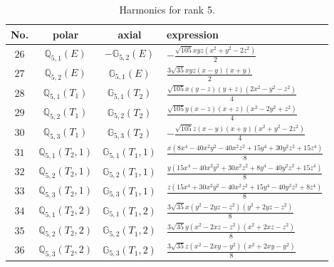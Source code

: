 \documentclass[fleqn,8pt,landscape]{jsarticle}
\begin{document}
\begin{table}[ht!]
\begin{center}
\caption{Harmonics for rank 5.}
\renewcommand{\arraystretch}{1.3}
\begin{tabular}{cccl} \hline \hline
No. & polar & axial & expression \\ \hline
$ 26 $ & $ \mathbb{Q}_{5,1}(E) $ & $ -\mathbb{G}_{5,2}(E) $ & $ - \frac{\sqrt{105} x y z \left(x^{2} + y^{2} - 2 z^{2}\right)}{2} $ \\
$ 27 $ & $ \mathbb{Q}_{5,2}(E) $ & $ \mathbb{G}_{5,1}(E) $ & $ \frac{3 \sqrt{35} x y z \left(x - y\right) \left(x + y\right)}{2} $ \\
$ 28 $ & $ \mathbb{Q}_{5,1}(T_{1}) $ & $ \mathbb{G}_{5,1}(T_{2}) $ & $ \frac{\sqrt{105} x \left(y - z\right) \left(y + z\right) \left(2 x^{2} - y^{2} - z^{2}\right)}{4} $ \\
$ 29 $ & $ \mathbb{Q}_{5,2}(T_{1}) $ & $ \mathbb{G}_{5,2}(T_{2}) $ & $ \frac{\sqrt{105} y \left(x - z\right) \left(x + z\right) \left(x^{2} - 2 y^{2} + z^{2}\right)}{4} $ \\
$ 30 $ & $ \mathbb{Q}_{5,3}(T_{1}) $ & $ \mathbb{G}_{5,3}(T_{2}) $ & $ - \frac{\sqrt{105} z \left(x - y\right) \left(x + y\right) \left(x^{2} + y^{2} - 2 z^{2}\right)}{4} $ \\
$ 31 $ & $ \mathbb{Q}_{5,1}(T_{2},1) $ & $ \mathbb{G}_{5,1}(T_{1},1) $ & $ \frac{x \left(8 x^{4} - 40 x^{2} y^{2} - 40 x^{2} z^{2} + 15 y^{4} + 30 y^{2} z^{2} + 15 z^{4}\right)}{8} $ \\
$ 32 $ & $ \mathbb{Q}_{5,2}(T_{2},1) $ & $ \mathbb{G}_{5,2}(T_{1},1) $ & $ \frac{y \left(15 x^{4} - 40 x^{2} y^{2} + 30 x^{2} z^{2} + 8 y^{4} - 40 y^{2} z^{2} + 15 z^{4}\right)}{8} $ \\
$ 33 $ & $ \mathbb{Q}_{5,3}(T_{2},1) $ & $ \mathbb{G}_{5,3}(T_{1},1) $ & $ \frac{z \left(15 x^{4} + 30 x^{2} y^{2} - 40 x^{2} z^{2} + 15 y^{4} - 40 y^{2} z^{2} + 8 z^{4}\right)}{8} $ \\
$ 34 $ & $ \mathbb{Q}_{5,1}(T_{2},2) $ & $ \mathbb{G}_{5,1}(T_{1},2) $ & $ \frac{3 \sqrt{35} x \left(y^{2} - 2 y z - z^{2}\right) \left(y^{2} + 2 y z - z^{2}\right)}{8} $ \\
$ 35 $ & $ \mathbb{Q}_{5,2}(T_{2},2) $ & $ \mathbb{G}_{5,2}(T_{1},2) $ & $ \frac{3 \sqrt{35} y \left(x^{2} - 2 x z - z^{2}\right) \left(x^{2} + 2 x z - z^{2}\right)}{8} $ \\
$ 36 $ & $ \mathbb{Q}_{5,3}(T_{2},2) $ & $ \mathbb{G}_{5,3}(T_{1},2) $ & $ \frac{3 \sqrt{35} z \left(x^{2} - 2 x y - y^{2}\right) \left(x^{2} + 2 x y - y^{2}\right)}{8} $ \\
 \hline \hline
\end{tabular}
\end{center}
\end{table}
\end{document}

